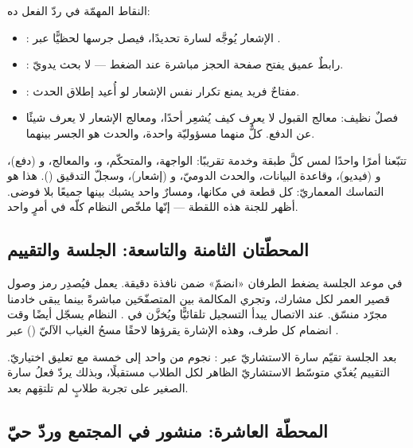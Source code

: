 النقاط المهمّة في ردّ الفعل ده:
\begin{itemize}
\item {}: الإشعار يُوجَّه لسارة تحديدًا،
فيصل جرسها لحظيًّا عبر .
\item {}: رابطٌ عميق يفتح صفحة الحجز مباشرة عند الضغط — لا بحث يدويّ.
\item {}: مفتاحٌ فريد يمنع تكرار نفس الإشعار لو أُعيد إطلاق الحدث.
\item فصلٌ نظيف: معالج القبول لا يعرف كيف يُشعِر أحدًا، ومعالج الإشعار لا يعرف شيئًا
عن الدفع. كلٌّ منهما مسؤوليّة واحدة، والحدث هو الجسر بينهما.
\end{itemize}

\begin{spotlight}
تتبّعنا أمرًا واحدًا لمس كلَّ طبقة وخدمة تقريبًا: الواجهة، والمتحكّم، و،
والمعالج، و (دفع)، و (فيديو)، وقاعدة البيانات، والحدث الدوميّ،
و (إشعار)، وسجلّ التدقيق (\en{[Auditable]}). هذا هو التماسك المعماريّ:
كل قطعة في مكانها، ومسارٌ واحد يشبك بينها جميعًا بلا فوضى. أظهر للجنة هذه اللقطة —
إنّها ملخّص النظام كلّه في أمرٍ واحد.
\end{spotlight}

\subsection{المحطّتان الثامنة والتاسعة: الجلسة والتقييم}

في موعد الجلسة يضغط الطرفان «انضمّ» ضمن نافذة  دقيقة. يعمل
 فيُصدِر رمز وصول  قصير العمر لكل مشارك،
وتجري المكالمة بين المتصفّحَين مباشرةً بينما يبقى خادمنا مجرّد منسّق. عند الاتصال
يبدأ التسجيل تلقائيًّا ويُخزَّن في . النظام يسجّل أيضًا وقت انضمام
كل طرف، وهذه الإشارة يقرؤها لاحقًا مسحُ الغياب الآليّ () عبر .

بعد الجلسة تقيّم سارة الاستشاريّ عبر : نجوم من
واحد إلى خمسة مع تعليق اختياريّ. التقييم يُغذّي متوسّط الاستشاريّ الظاهر لكل الطلاب
مستقبلًا، وبذلك يردّ فعلُ سارة الصغير على تجربة طلابٍ لم تلتقِهم بعد.

\subsection{المحطّة العاشرة: منشور في المجتمع وردّ حيّ}

